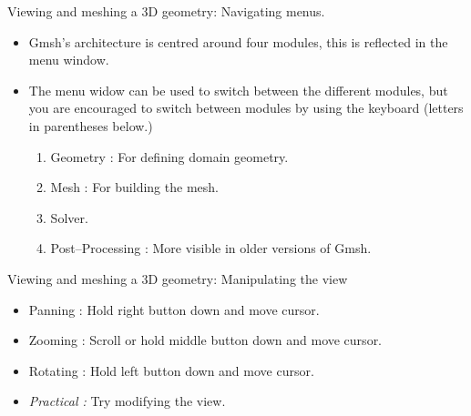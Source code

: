 \documentclass[t]{beamer}
\begin{document}
\begin{frame}{Viewing and meshing a 3D geometry: Navigating menus.}
   \begin{itemize}
     \item Gmsh's architecture is centred around four modules, this is reflected in the menu window.\\[10pt]
     \item The menu widow can be used to switch between the different modules, but you are encouraged to switch between modules by using the keyboard (letters in parentheses below.)\\[10pt]
     \begin{enumerate}
       \item Geometry : For defining domain geometry.
       \item Mesh : For building the mesh.
       \item Solver.
       \item Post--Processing : More visible in older versions of Gmsh.
     \end{enumerate}
   \end{itemize}
\end{frame}

\begin{frame}{Viewing and meshing a 3D geometry: Manipulating the view}
\begin{itemize}
\item Panning : Hold right button down and move cursor.
\item Zooming : Scroll or hold middle button down and move cursor.
\item Rotating : Hold left button down and move cursor.
\item \emph{Practical :} Try modifying the view.
\end{itemize}
\end{frame}
\end{document}
